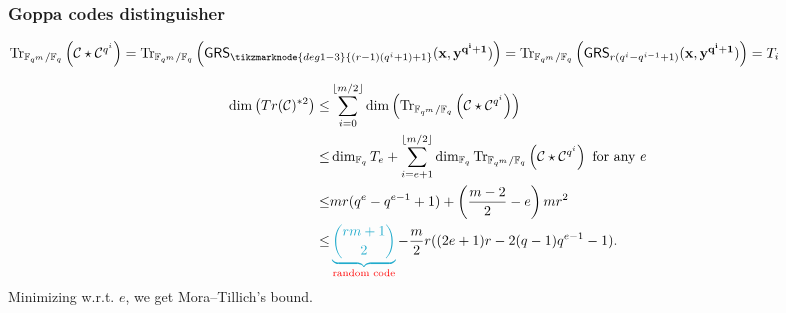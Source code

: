 \documentclass[
10pt, %
%
aspectratio=169, %
]{beamer}
\theoremstyle{plain}%
\theoremstyle{definition}
\theoremstyle{remark}
\newcommand{\calC}{\mathcal{C}}
\newcommand{\fqm}{\mathbb{F}_{q^m}}
\newcommand{\fq}{\mathbb{F}_{q}}
\newcommand{\Tr}[1]{\operatorname{Tr}_{\mathbb{F}_{q^m}/\fq}\left(#1\right)}
\newcommand{\GRS}{\operatorname{\mathsf{GRS}}}
\begin{document}
\begin{frame}
	\frametitle{Goppa codes distinguisher \cite{MT21}}
	
	$\Tr{\calC\star \calC^{q^i}}=\Tr{\GRS_{\tikzmarknode{deg1-3}{(r-1)(q^i+1)+1}}(\mathbf{x},\mathbf{y^{q^i+1}})}= \Tr{\GRS_{r(q^i -q^{i-1}+1)}(\mathbf{x},\mathbf{y^{q^i+1}})} = T_i$
	
	\vspace{-0.9em}
\begin{align*}
	\dim\left( Tr(\calC)^{*2}\right) \leq& \sum\limits_{i=0}^{\lfloor{m/2} \rfloor} \dim \left( \Tr{\calC\star \calC^{q^i}}\right)\\
									\leq& \dim_{\fq}T_e+ \sum\limits_{i=e+1}^{\lfloor{m/2} \rfloor} \dim_{\fq}\Tr{\calC\star \calC^{q^i}} \text{ for any } e\\
	\leq& mr(q^e -q^{e-1}+1) + \left( \frac{m-2}{2}-e\right) mr^2\\
	\leq& \mathcolor{ballblue}{\underbrace{\binom{rm+1}{2}}}_{\text{\textcolor{red}{random code}}}  - \frac{m}{2}r((2e+1)r - 2(q-1)q^{e-1}-1).
\end{align*}
Minimizing w.r.t. $e$, we get Mora--Tillich's bound.

\end{frame}
\end{document}
